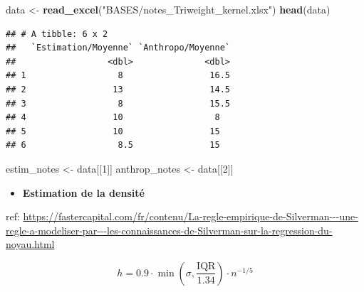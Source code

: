 \documentclass[
  12pt,
]{article}
\newenvironment{Shaded}{\begin{snugshade}}{\end{snugshade}}
\newcommand{\DecValTok}[1]{\textcolor[rgb]{0.00,0.00,0.81}{#1}}
\newcommand{\FunctionTok}[1]{\textcolor[rgb]{0.13,0.29,0.53}{\textbf{#1}}}
\newcommand{\NormalTok}[1]{#1}
\newcommand{\OtherTok}[1]{\textcolor[rgb]{0.56,0.35,0.01}{#1}}
\newcommand{\StringTok}[1]{\textcolor[rgb]{0.31,0.60,0.02}{#1}}
\providecommand{\tightlist}{%
  \setlength{\itemsep}{0pt}\setlength{\parskip}{0pt}}
\begin{document}
\begin{Shaded}
\begin{Highlighting}[]
\NormalTok{data }\OtherTok{\textless{}{-}} \FunctionTok{read\_excel}\NormalTok{(}\StringTok{"BASES/notes\_Triweight\_kernel.xlsx"}\NormalTok{)}
\FunctionTok{head}\NormalTok{(data)}
\end{Highlighting}
\end{Shaded}

\begin{verbatim}
## # A tibble: 6 x 2
##   `Estimation/Moyenne` `Anthropo/Moyenne`
##                  <dbl>              <dbl>
## 1                  8                 16.5
## 2                 13                 14.5
## 3                  8                 15.5
## 4                 10                  8  
## 5                 10                 15  
## 6                  8.5               15
\end{verbatim}

\begin{Shaded}
\begin{Highlighting}[]
\NormalTok{estim\_notes }\OtherTok{\textless{}{-}}\NormalTok{ data[[}\DecValTok{1}\NormalTok{]]}
\NormalTok{anthrop\_notes }\OtherTok{\textless{}{-}}\NormalTok{ data[[}\DecValTok{2}\NormalTok{]]}
\end{Highlighting}
\end{Shaded}

\begin{itemize}
\tightlist
\item
  \textbf{Estimation de la densité}
\end{itemize}

ref:
\url{https://fastercapital.com/fr/contenu/La-regle-empirique-de-Silverman---une-regle-a-modeliser-par---les-connaissances-de-Silverman-sur-la-regression-du-noyau.html}

\[
h = 0.9 \cdot \min\left( \sigma, \frac{\text{IQR}}{1.34} \right) \cdot n^{-1/5}
\]
\end{document}
